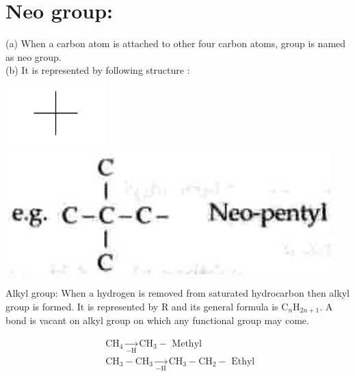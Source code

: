\documentclass[10pt]{article}
\begin{document}
\section*{Neo group:}
(a) When a carbon atom is attached to other four carbon atoms, group is named as neo group.\\
(b) It is represented by following structure :\\
\includegraphics{smile-3c23584335d63d223fc68d5740b5ad2a54044443}\\
\includegraphics[max width=\textwidth, center]{2025_01_28_8470952b98110cec3aabg-009(1)}

Alkyl group: When a hydrogen is removed from saturated hydrocarbon then alkyl group is formed. It is represented by R and its general formula is $\mathrm{C}_{n} \mathrm{H}_{2 n+1}$. A bond is vacant on alkyl group on which any functional group may come.

$$
\begin{aligned}
& \mathrm{CH}_{4} \xrightarrow[-\mathrm{H}]{ } \mathrm{CH}_{3}-\text { Methyl } \\
& \mathrm{CH}_{3}-\mathrm{CH}_{3} \xrightarrow[-\mathrm{H}]{ } \mathrm{CH}_{3}-\mathrm{CH}_{2}-\text { Ethyl }
\end{aligned}
$$
\end{document}
